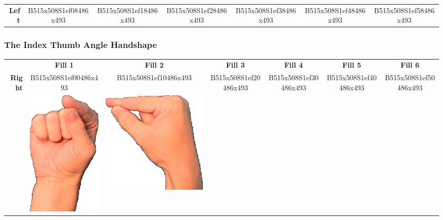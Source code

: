 \documentclass{article}
\begin{document}
\begin{center}
\begin{tabular}{r*{6}{c}}
\textbf{Left}&
B515x508S1ef08486x493&
B515x508S1ef18486x493&
B515x508S1ef28486x493&
B515x508S1ef38486x493&
B515x508S1ef48486x493&
B515x508S1ef58486x493\\
\end{tabular}
\end{center}

\subsubsection{The Index Thumb Angle Handshape}

\begin{center}
\begin{tabular}{r*{6}{c}}
&\textbf{Fill 1}&\textbf{Fill 2}&\textbf{Fill 3}&\textbf{Fill 4}&\textbf{Fill 5}&\textbf{Fill 6}\\
\multirow{2}{*}{\textbf{Right}}&
B515x508S1ef00486x493&
B515x508S1ef10486x493&
B515x508S1ef20486x493&
B515x508S1ef30486x493&
B515x508S1ef40486x493&
B515x508S1ef50486x493\\
&
\includegraphics[scale=0.1]{images/09-13-1.jpg}&
\includegraphics[scale=0.1]{images/09-13-2.jpg}&

\end{tabular}
\end{center}
\end{document}
